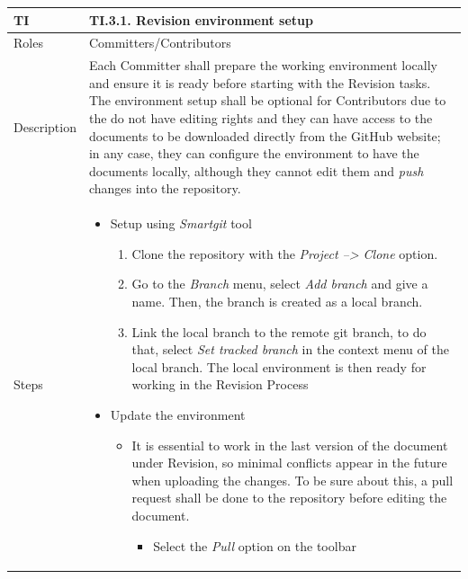\documentclass{template/openetcs_article}
\begin{document}
\begin{flushleft}
\tablefirsthead{}
\tablehead{}
\tabletail{}
\tablelasttail{}
\begin{supertabular}{|m{2cm}|m{13cm}|}
\hline
{}
TI & 
TI.3.1. Revision environment setup
\\\hline
Roles &
Committers/Contributors
\\\hline
Description &
Each Committer shall prepare the working environment locally and ensure it is ready before starting with the Revision tasks. The environment setup shall be optional for Contributors due to the do not have editing rights and they can have access to the documents to be downloaded directly from the GitHub website; in any case, they can configure the environment to have the documents locally, although they cannot edit them and {\it push} changes into the repository.
\\\hline
Steps &
\begin{itemize}
\item Setup using {\it Smartgit} tool
\begin{enumerate}
\item Clone the repository with the {\it Project --> Clone} option.
\item Go to the {\it Branch} menu, select {\it Add branch} and give a name. Then, the branch is created as a local branch.
\item Link the local branch to the remote git branch, to do that, select {\it Set tracked branch} in the context menu of the local branch. The local environment is then ready for working in the Revision Process
\end{enumerate}
\item Update the environment
\begin{itemize}
\item It is essential to work in the last version of the document under Revision, so minimal conflicts appear in the future when uploading the changes. To be sure about this, a pull request shall be done to the repository before editing the document.
\begin{itemize}
\item Select the {\it Pull} option on the toolbar
\end{itemize}
\end{itemize}
\end{itemize}
\\\hline
\end{supertabular}
\end{flushleft}
\end{document}

